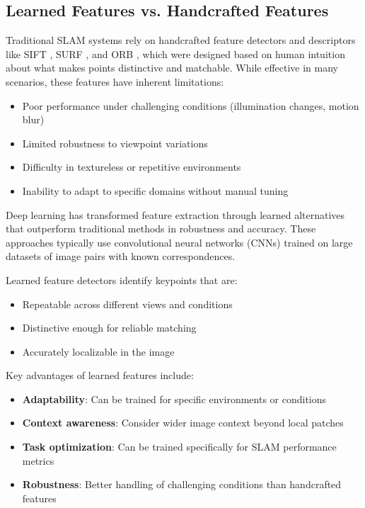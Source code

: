 \documentclass[12pt]{article}
\begin{document}
    \subsection{Learned Features vs. Handcrafted Features}
    
    Traditional SLAM systems rely on handcrafted feature detectors and descriptors like SIFT \cite{sift}, SURF \cite{surf}, and ORB \cite{orb_slam}, which were designed based on human intuition about what makes points distinctive and matchable. 
    While effective in many scenarios, these features have inherent limitations:
    
    \begin{itemize}
        \item Poor performance under challenging conditions (illumination changes, motion blur)
        \item Limited robustness to viewpoint variations
        \item Difficulty in textureless or repetitive environments
        \item Inability to adapt to specific domains without manual tuning
    \end{itemize}
    
    Deep learning has transformed feature extraction through learned alternatives that outperform traditional methods in robustness and accuracy. 
    These approaches typically use convolutional neural networks (CNNs) trained on large datasets of image pairs with known correspondences.
    
    \newpage
    Learned feature detectors identify keypoints that are:
    \begin{itemize}
        \item Repeatable across different views and conditions
        \item Distinctive enough for reliable matching
        \item Accurately localizable in the image
    \end{itemize}
    
    Key advantages of learned features include:
    \begin{itemize}
        \item \textbf{Adaptability}: Can be trained for specific environments or conditions
        \item \textbf{Context awareness}: Consider wider image context beyond local patches
        \item \textbf{Task optimization}: Can be trained specifically for SLAM performance metrics
        \item \textbf{Robustness}: Better handling of challenging conditions than handcrafted features
    \end{itemize}
    
\end{document}
